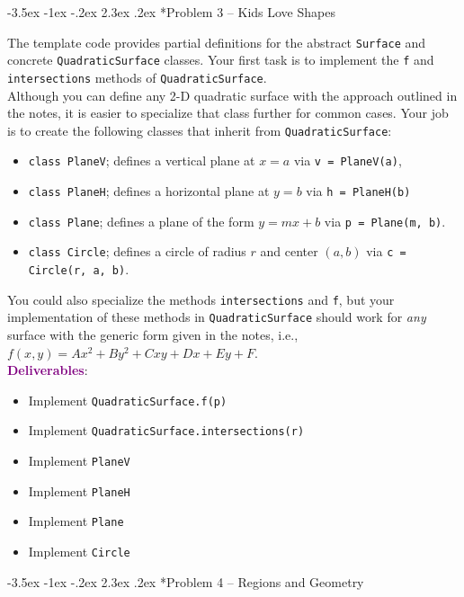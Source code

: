 \documentclass[12pt]{article}
\makeatletter
\renewcommand\section{\@startsection{section}{1}{\z@}%
                                  {-3.5ex \@plus -1ex \@minus -.2ex}%
                                  {2.3ex \@plus.2ex}%
                                  {\normalfont\bfseries}}
\makeatother
\begin{document}
\section*{Problem 3 -- Kids Love Shapes}

The template code provides partial definitions for 
the abstract {\tt Surface} and concrete 
{\tt QuadraticSurface} classes.  Your
first task is to implement the {\tt f} and {\tt intersections}
methods of {\tt QuadraticSurface}.\\


Although you can define any 2-D quadratic surface with the approach
outlined in the notes, it is easier to specialize that
class further for common cases.  Your job is to 
create the following classes that inherit from {\tt QuadraticSurface}:
\begin{itemize} %
  \item {\tt class PlaneV}; defines a vertical plane at $x=a$ via
        {\tt v = PlaneV(a)},
  \item {\tt class PlaneH}; defines a horizontal plane at $y=b$ via
        {\tt h = PlaneH(b)}
  \item {\tt class Plane}; defines a plane of the form $y = mx + b$
        via {\tt p = Plane(m, b)}.
  \item {\tt class Circle}; defines a circle of radius $r$ and center $(a, b)$
       via {\tt c = Circle(r, a, b)}.
\end{itemize}
\vspace{12pt}
You could also specialize the methods {\tt intersections}
and {\tt f}, but your implementation of these methods in 
{\tt QuadraticSurface} should work for {\it any} surface 
with the generic form given in the notes, i.e., 
$f(x, y) = Ax^2 + By^2 + Cxy + Dx + Ey + F$. \\

{\bf \textcolor{purple}{Deliverables}}:
\begin{itemize}
 \item Implement {\tt QuadraticSurface.f(p)}
 \item Implement {\tt QuadraticSurface.intersections(r)}
 \item Implement {\tt PlaneV}
 \item Implement {\tt PlaneH}
 \item Implement {\tt Plane}
 \item Implement {\tt Circle}
\end{itemize}


\section*{Problem 4 -- Regions and Geometry}
\end{document}
